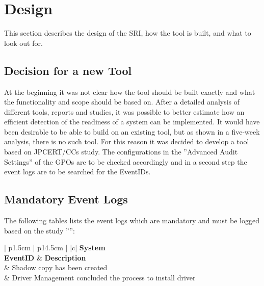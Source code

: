 \section{Design}
This section describes the design of the SRI, how the tool is built, and what to look out for.
\subsection{Decision for a new Tool}
At the beginning it was not clear how the tool should be built exactly and what the functionality and scope should be based on. After a detailed analysis of different tools, reports and studies, it was possible to better estimate how an efficient detection of the readiness of a system can be implemented. It would have been desirable to be able to build on an existing tool, but as shown in a five-week analysis, there is no such tool. For this reason it was decided to develop a tool based on JPCERT/CCs study. The configurations in the ''Advanced Audit Settings'' of the GPOs are to be checked accordingly and in a second step the event logs are to be searched for the EventIDs.

\subsection{Mandatory Event Logs}\label{MandatoryLogs}
The following tables lists the event logs which are mandatory and must be logged based on the study '''':
\
\vspace{0.5cm}
\begin{table}[H]
    \centering
    \begin{tabular}{| p{1.5cm} | p{14.5cm} |} \hline
         {|c|} {\tiny\bfseries System} \\ \hline
        \textbf{EventID} & \textbf{Description}  \\ \footnotemark[2] & Shadow copy has been created \\ \hline
        20001\footnotemark[2] & Driver Management concluded the process to install driver  \\ \hline
    \end{tabular}
    \caption{Mandatory System Event Logs}
\end{table}



